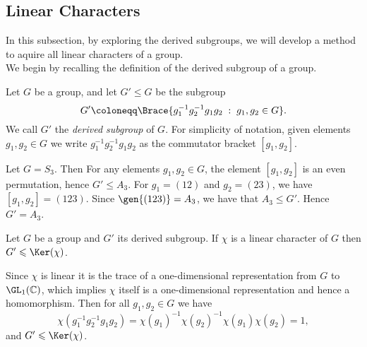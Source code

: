 \documentclass[../Project.tex]{subfiles}
\begin{document}
\newpage
\subsection{Linear Characters}
In this subsection, by exploring the derived subgroups, we will develop a method to aquire all linear characters of a group.\\


We begin by recalling the definition of the derived subgroup of a group.

\begin{defi}
	Let $G$ be a group, and let $G' \leqslant G$ be the subgroup
	$$G' \coloneqq \Brace{g_1^{-1}g_2^{-1}g_1g_2\;:\;g_1,g_2 \in G}.$$
	We call $G'$ the \textit{derived subgroup} of $G$. For simplicity of notation, given elements $g_1,g_2 \in G$ we write $g_1^{-1}g_2^{-1}g_1g_2$ as the commutator bracket $[g_1,g_2]$.\\
\end{defi}

\begin{exam}[{\cite[Examples 17.8 (2)]{2}}]
	Let $G = S_3$. Then For any elements $g_1,g_2 \in G$, the element $[g_1,g_2]$ is an even permutation, hence $G' \leqslant A_3$. For $g_1 = (12)$ and $g_2 = (23)$, we have $[g_1,g_2] = (123)$. Since $\gen{(123)} = A_3$, we have that $A_3 \leqslant G'$. Hence $G' = A_3$.
	\label{derivofS3}
\end{exam}

\begin{prop}[{\cite[Proposition 17.9]{2}}]
	Let $G$ be a group and $G'$ its derived subgroup. If $\chi$ is a linear character of $G$ then $G' \leqslant \Ker(\chi)$.
	\label{derivedsubgroupofker}
\end{prop}
\begin{proo*}[{\cite[Proposition 17.9]{2}}]
	Since $\chi$ is linear it is the trace of a one-dimensional representation from $G$ to $\GL_1(\mathbb{C})$, which implies $\chi$ itself is a one-dimensional representation and hence a homomorphism. Then for all $g_1,g_2 \in G$ we have
	$$\chi(g_1^{-1}g_2^{-1}g_1g_2) = \chi(g_1)^{-1}\chi(g_2)^{-1}\chi(g_1)\chi(g_2) = 1,$$
	and $G' \leqslant \Ker(\chi)$.\\
\end{proo*}
\end{document}
